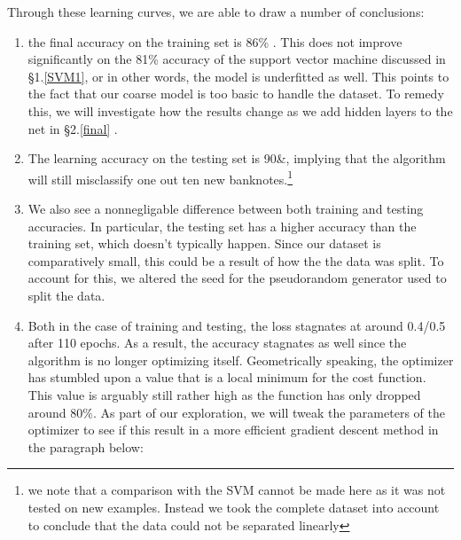 \documentclass[14pt]{article}
\theoremstyle{plain}
\theoremstyle{definition}
\begin{document}
Through these learning curves, we are able to draw a number of conclusions:
\begin{enumerate}
\item the final accuracy on the training set is 86\% . This does not improve significantly on the 81\% accuracy of the support vector machine discussed in \S 1.\ref{SVM1}, or in other words, the model is underfitted as well. This points to the fact that our coarse model is too basic to handle the dataset. To remedy this, we will investigate how the results change as we add hidden layers to the net in \S2.\ref{final} .
\item The learning accuracy on the testing set is 90\&, implying that the algorithm will still misclassify one out ten new banknotes.\footnote{we note that a comparison with the SVM cannot be made here as it was not tested on new examples. Instead we took the complete dataset into account to conclude that the data could not be separated linearly}  
\item We also see a nonnegligable difference between both training and testing accuracies. In particular, the testing set has a higher accuracy than the training set, which doesn't typically happen. Since our dataset is comparatively small, this could be a result of how the the data was split. To account for this, we altered the seed for the pseudorandom generator used to split the data.
\item Both in the case of training and testing, the loss stagnates at around 0.4/0.5 after 110 epochs. As a result, the accuracy stagnates as well since the algorithm is no longer optimizing itself. Geometrically speaking, the optimizer has stumbled upon a value that is a local minimum for the cost function. This value is arguably still rather high as the function has only dropped around 80\%. As part of our exploration,  we will tweak the parameters of the optimizer to see if this result in a more efficient gradient descent method in the paragraph below:
\end{enumerate}
\end{document}
